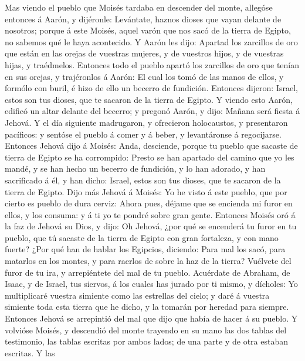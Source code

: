  Mas viendo el pueblo que Moisés tardaba en descender del
monte, allegóse entonces á Aarón, y dijéronle: Levántate, haznos dioses
que vayan delante de nosotros; porque á este Moisés, aquel varón que nos
sacó de la tierra de Egipto, no sabemos qué le haya acontecido.
 Y Aarón les dijo: Apartad los zarcillos de oro que están en
las orejas de vuestras mujeres, y de vuestros hijos, y de vuestras
hijas, y traédmelos.  Entonces todo el pueblo apartó los
zarcillos de oro que tenían en sus orejas, y trajéronlos á Aarón:
 El cual los tomó de las manos de ellos, y formólo con
buril, é hizo de ello un becerro de fundición. Entonces dijeron: Israel,
estos son tus dioses, que te sacaron de la tierra de Egipto.
 Y viendo esto Aarón, edificó un altar delante del becerro;
y pregonó Aarón, y dijo: Mañana será fiesta á Jehová.  Y el
día siguiente madrugaron, y ofrecieron holocaustos, y presentaron
pacíficos: y sentóse el pueblo á comer y á beber, y levantáronse á
regocijarse.  Entonces Jehová dijo á Moisés: Anda,
desciende, porque tu pueblo que sacaste de tierra de Egipto se ha
corrompido:  Presto se han apartado del camino que yo les
mandé, y se han hecho un becerro de fundición, y lo han adorado, y han
sacrificado á él, y han dicho: Israel, estos son tus dioses, que te
sacaron de la tierra de Egipto.  Dijo más Jehová á Moisés:
Yo he visto á este pueblo, que por cierto es pueblo de dura cerviz:
 Ahora pues, déjame que se encienda mi furor en ellos, y
los consuma: y á ti yo te pondré sobre gran gente. 
Entonces Moisés oró á la faz de Jehová su Dios, y dijo: Oh Jehová, ¿por
qué se encenderá tu furor en tu pueblo, que tú sacaste de la tierra de
Egipto con gran fortaleza, y con mano fuerte?  ¿Por qué han
de hablar los Egipcios, diciendo: Para mal los sacó, para matarlos en
los montes, y para raerlos de sobre la haz de la tierra? Vuélvete del
furor de tu ira, y arrepiéntete del mal de tu pueblo. 
Acuérdate de Abraham, de Isaac, y de Israel, tus siervos, á los cuales
has jurado por ti mismo, y dícholes: Yo multiplicaré vuestra simiente
como las estrellas del cielo; y daré á vuestra simiente toda esta tierra
que he dicho, y la tomarán por heredad para siempre. 
Entonces Jehová se arrepintió del mal que dijo que había de hacer á su
pueblo.  Y volvióse Moisés, y descendió del monte trayendo
en su mano las dos tablas del testimonio, las tablas escritas por ambos
lados; de una parte y de otra estaban escritas.  Y las
